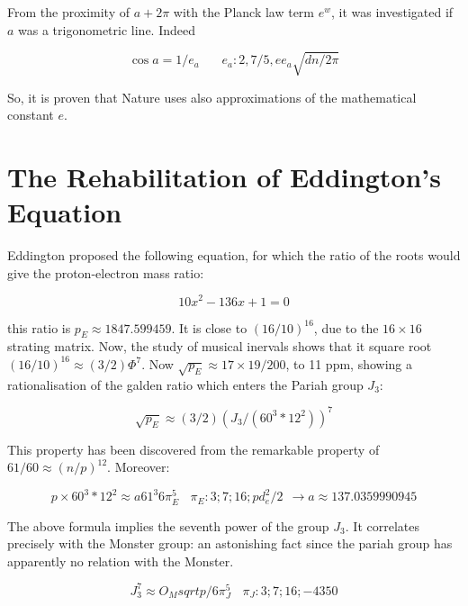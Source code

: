 \documentclass[a4paper,9pt]{article}
\begin{document}
From the proximity of $a + 2\pi$ with the Planck law term $e^w$, it was investigated if $a$ was a trigonometric line. Indeed 
 
\begin{equation}
\cos{a} = 1/e_a ~~~~~~~~  e_a : 2, 7/5, ee_a \sqrt{dn/2\pi} 
\end{equation}

So, it is proven that Nature uses also approximations of the mathematical constant $e$.








\section{The Rehabilitation of Eddington's Equation}
Eddington proposed the following equation, for which the ratio of the roots would give the proton-electron mass ratio:

\begin{equation}
 10x^2 - 136x +1 = 0     
\end{equation}

this ratio is $p_E \approx 1847.599459$. It is close to $(16/10)^16$, due to the $16 \times 16$ strating matrix. Now, the study of musical inervals shows that it square root $(16/10)^16 \approx (3/2) \Phi^7$. Now $\sqrt {p_E} \approx 17 \times 19 / 200$, to 11 ppm, showing a rationalisation of the galden ratio which enters the Pariah group $J_3$:

\begin{equation}
 \sqrt {p_E} \approx (3/2) (J_3/(60^3*12^2))^7   
\end{equation}

This property has been discovered from the remarkable property of $61/60 \approx (n/p)^{12}$. Moreover: 

\begin{equation}
 p \times 60^3*12^2 \approx a 61^3 6\pi_E^5~~~~ \pi_E : 3; 7; 16; pd_e^2/2 ~~ \rightarrow a\approx 137.0359990945    
\end{equation}

The above formula implies the seventh power of the group $J_3$. It correlates precisely with the Monster group: an astonishing fact since the pariah group has apparently no relation with the Monster.

\begin{equation}
J_3^7 \approx O_M sqrt{p/6\pi_J^5}~~~~ \pi_J : 3; 7; 16; -4350    
\end{equation}
\end{document}
